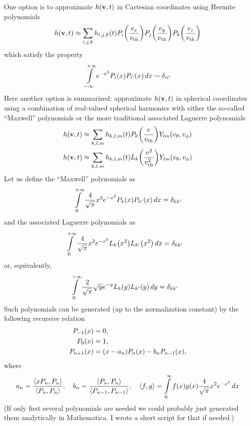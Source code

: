 \documentclass[10pt,letterpaper]{article}
\newcommand{\myint}[2]{\int\limits_{#1}^{#2}}
\newcommand{\diff}[1]{\, d#1}
\newcommand{\vect}[1]{\mathbf{#1}}
\newcommand{\of}[1]{\mleft( #1 \mright)}
\newcommand{\vth}{v_\textrm{th}}
\begin{document}
One option is to approximate $h\of{\vect{v}, t}$ in Cartesian coordinates using Hermite polynomials
\begin{align*}
h\of{\vect{v},t} \approx
\sum_{i,j,k} h_{i,j,k} \of{t} P_i\of{\frac{v_x}{\vth}} P_j\of{\frac{v_y}{\vth}}  P_k\of{\frac{v_z}{\vth}} 
\end{align*}
which satisfy the property
\begin{align*}
\myint{-\infty}{+\infty} e^{-x^2} P_i\of{x} P_{i^\prime}\of{x} \diff{x} \sim \delta_{ii^\prime}
\end{align*}
Here another option is summarized: approximate $h\of{\vect{v}, t}$ in spherical coordinates using a combination of real-valued spherical harmonics with either the so-called ``Maxwell'' polynomials or the more traditional associated Laguerre polynomials
\begin{align*}
h\of{\vect{v},t} &\approx
\sum_{k,l,m} h_{k,l,m} \of{t} P_k\of{\frac{v}{\vth}} Y_{lm}\of{v_\theta, v_\phi}
\\
h\of{\vect{v},t} &\approx
\sum_{k,l,m} h_{k,l,m} \of{t} L_k\of{\frac{v^2}{\vth^2}} Y_{lm}\of{v_\theta, v_\phi}
\end{align*}
Let us define the ``Maxwell'' polynomials as 
\begin{align*}
\myint{0}{+\infty} \frac{4}{\sqrt{\pi}} x^2 e^{-x^2} P_k\of{x} P_{k^\prime}\of{x} \diff{x} = \delta_{kk^\prime}
\end{align*}
and the associated Laguerre polynomials as
\begin{align*}
\myint{0}{+\infty} \frac{4}{\sqrt{\pi}} x^2 e^{-x^2} L_k\of{x^2} L_{k^\prime}\of{x^2} \diff{x} &= \delta_{kk^\prime}
\end{align*}
or, equivalently, 
\begin{align*}
\myint{0}{+\infty} \frac{2}{\sqrt{\pi}} \sqrt{y} e^{-y} L_k\of{y} L_{k^\prime}\of{y} \diff{y} &= \delta_{kk^\prime}
\end{align*}
Such polynomials can be generated (up to the normalization constant) by the following recursive relation
\begin{align*}
P_{-1}\of{x} &= 0, \\
P_{0}\of{x} &= 1, \\
P_{n+1}\of{x} &= (x-a_n) P_{n}\of{x} - b_n P_{n-1} \of{x},
\end{align*}
where
\begin{align*}
a_n = \frac{\left< x P_n, P_n \right>}{\left< P_n, P_n \right>}, \quad
b_n = \frac{\left< P_n, P_n \right>}{\left< P_{n-1}, P_{n-1} \right>}, \quad
\left< f, g \right> = \myint{0}{\infty} f\of{x} g\of{x} \frac{4}{\sqrt{\pi}} x^2 e^{-x^2} \diff{x}
\end{align*}
(If only first several polynomials are needed we could probably just generated them analytically in Mathematica. I wrote a short script for that if needed.)
\end{document}
